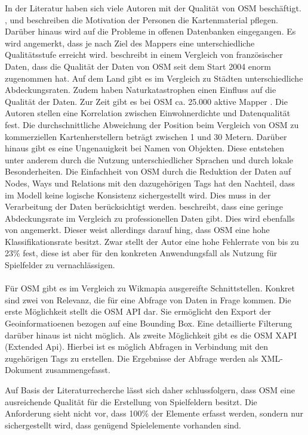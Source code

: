 In der Literatur haben sich viele Autoren mit der Qualität von OSM beschäftigt.
\textcite{Haklay.2010}, \textcite{Flanagin.2008} und \textcite{Goodchild.2007} beschreiben die Motivation der Personen die Kartenmaterial pflegen. Darüber hinaus wird auf die Probleme in offenen Datenbanken eingegangen. Es wird angemerkt, dass je nach Ziel des Mappers eine unterschiedliche Qualitätsstufe erreicht wird.
\textcite{Girres.2010} beschreibt in einem Vergleich von französischer Daten, dass die Qualität der Daten von OSM seit dem Start 2004 enorm zugenommen hat. Auf dem Land gibt es im Vergleich zu Städten unterschiedliche Abdeckungsraten. Zudem haben Naturkatastrophen einen Einfluss auf die Qualität der Daten.\cite{Zook.2010}
Zur Zeit gibt es bei OSM ca. 25.000 aktive Mapper \cite{OSM.2013}. Die Autoren stellen eine Korrelation zwischen Einwohnerdichte und Datenqualität fest.
Die durchschnittliche Abweichung der Position beim Vergleich von OSM zu kommerziellen Kartenherstellern beträgt zwischen 1 und 30 Metern.
Darüber hinaus gibt es eine Ungenauigkeit bei Namen von Objekten. Diese entstehen unter anderem durch die Nutzung unterschiedlicher Sprachen und durch lokale Besonderheiten.
Die Einfachheit von OSM durch die Reduktion der Daten auf Nodes, Ways und Relations mit den dazugehörigen Tags hat den Nachteil, dass im Modell keine logische Konsistenz sichergestellt wird. Dies muss in der Verarbeitung der Daten berücksichtigt werden.
\textcite{Hecht.2013} beschreibt, dass eine geringe Abdeckungsrate im Vergleich zu professionellen Daten gibt. Dies wird ebenfalls von \textcite{Pfoser.2013} angemerkt. Dieser weist allerdings darauf hing, dass OSM eine hohe Klassifikationsrate besitzt. Zwar stellt der Autor eine hohe Fehlerrate von bis zu 23\% fest, diese ist aber für den konkreten Anwendungsfall als Nutzung für Spielfelder  zu vernachlässigen.
\\\\
Für OSM gibt es im Vergleich zu Wikmapia ausgereifte Schnittstellen. Konkret sind zwei von Relevanz, die für eine Abfrage von Daten in Frage kommen.
Die erste Möglichkeit stellt die OSM API dar. Sie ermöglicht den Export der Geoinformatioenen bezogen auf eine Bounding Box. Eine detaillierte Filterung darüber hinaus ist nicht möglich.
Als zweite Möglichkeit gibt es die OSM XAPI (Extended Api). Hierbei ist es möglich Abfragen in Verbindung mit den zugehörigen Tags zu erstellen.\cite{Meyer.2013} Die Ergebnisse der Abfrage werden als XML-Dokument zusammengefasst.

Auf Basis der Literaturrecherche lässt sich daher schlussfolgern, dass OSM eine ausreichende Qualität für die Erstellung von Spielfeldern besitzt. Die Anforderung sieht nicht vor, dass 100\% der Elemente erfasst werden, sondern nur sichergestellt wird, dass genügend Spielelemente vorhanden sind.



